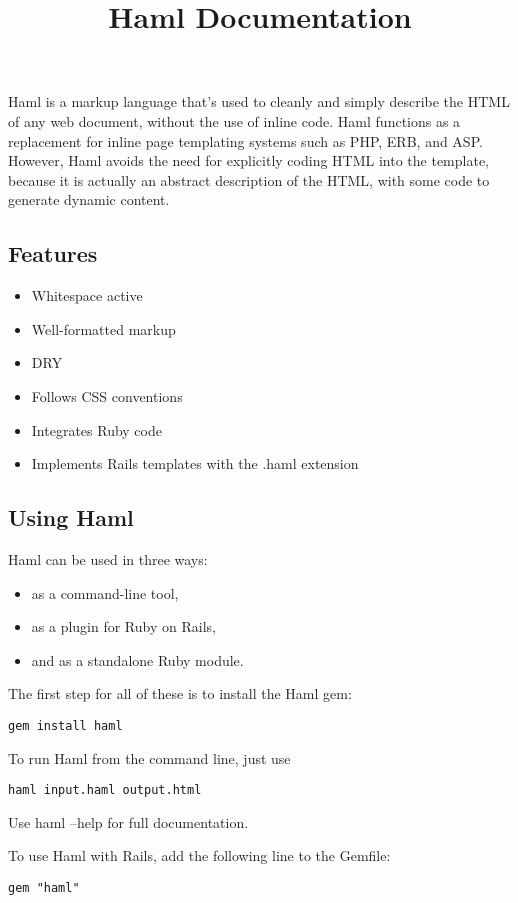 \documentclass[10pt]{article}
\title{ Haml Documentation }
\begin{document}
 Haml is a markup language that’s used to cleanly and simply describe the HTML of any web document, without the use of inline code. Haml functions as a replacement for inline page templating systems such as PHP, ERB, and ASP. However, Haml avoids the need for explicitly coding HTML into the template, because it is actually an abstract description of the HTML, with some code to generate dynamic content.
\subsection*{Features}
\begin{itemize}
\item Whitespace active
\item Well-formatted markup
\item DRY
\item Follows CSS conventions
\item Integrates Ruby code
\item Implements Rails templates with the .haml extension

\end{itemize}
\subsection*{Using Haml}


 Haml can be used in three ways:
\begin{itemize}
\item as a command-line tool,
\item as a plugin for Ruby on Rails,
\item and as a standalone Ruby module.

\end{itemize}


 The first step for all of these is to install the Haml gem:
\begin{verbatim}
gem install haml
\end{verbatim}


 To run Haml from the command line, just use
\begin{verbatim}
haml input.haml output.html
\end{verbatim}


 Use haml --help for full documentation.


 To use Haml with Rails, add the following line to the Gemfile:
\begin{verbatim}
gem "haml"
\end{verbatim}
\end{document}
